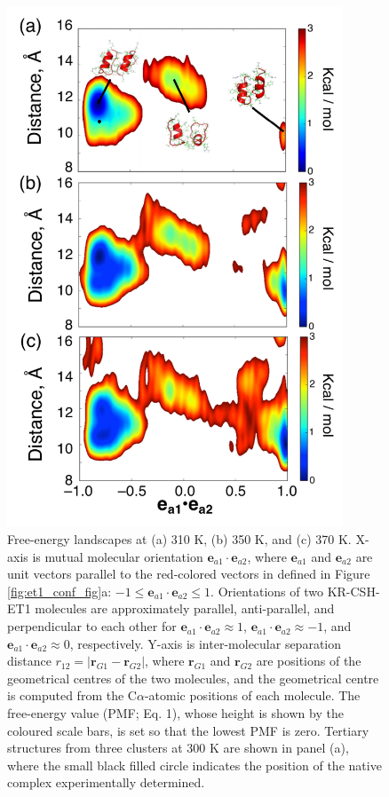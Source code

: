 \begin{figure}
  \centering
  \includegraphics[width=10cm]{../enhance_rev/figures/dimer_form_fel.pdf}
  \caption{ \label{fig:dimer_form_fel_fig} 
Free-energy landscapes at (a) 310 K, (b) 350 K, and (c) 370 K. X-axis is mutual molecular orientation $\bm{e}_{a1} \cdot \bm{e}_{a2}$, where $\bm{e}_{a1}$ and $\bm{e}_{a2}$ are unit vectors parallel to the red-colored vectors in defined in Figure \ref{fig:et1_conf_fig}a: $-1 \leq \bm{e}_{a1} \cdot \bm{e}_{a2} \leq1$. Orientations of two KR-CSH-ET1 molecules are approximately parallel, anti-parallel, and perpendicular to each other for $\bm{e}_{a1} \cdot \bm{e}_{a2} \approx 1$, $\bm{e}_{a1} \cdot \bm{e}_{a2} \approx -1$, and $\bm{e}_{a1} \cdot \bm{e}_{a2} \approx 0$, respectively. Y-axis is inter-molecular separation distance $r_{12}=|\bm{r}_{G1}-\bm{r}_{G2}|$, where $\bm{r}_{G1}$ and $\bm{r}_{G2}$ are positions of the geometrical centres of the two molecules, and the geometrical centre is computed from the C$\alpha$-atomic positions of each molecule. The free-energy value (PMF; Eq. 1), whose height is shown by the coloured scale bars, is set so that the lowest PMF is zero. Tertiary structures from three clusters at 300 K are shown in panel (a), where the small black filled circle indicates the position of the native complex experimentally determined.}
\end{figure}

